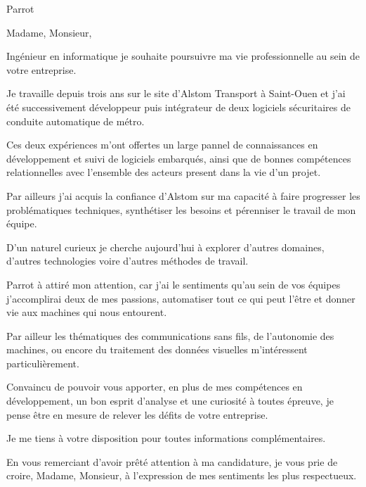 \documentclass[12pt]{lettre}
\makeatletter
\newcommand*{\NoRule}{\renewcommand*{\rule@length}{0}}
\makeatother
\begin{document}
\begin{letter}{Parrot}

  \def\concname{Objet :~}


  \signature{Hoel IRIS}
  \address{Hoel IRIS\\
  54 avenue Mathurin Moreau\\
  75019 Paris\\
  Tel : 06 18 39 30 11\\
  E-Mail : hoel.iris@gmail.com}
  \NoRule
  \notelephone
  \nofax
    \opening{Madame, Monsieur,}


    Ingénieur en informatique je souhaite poursuivre ma vie professionnelle au sein de votre entreprise.

    Je travaille depuis trois ans sur le site d'Alstom Transport à Saint-Ouen et j'ai été successivement développeur puis intégrateur de deux logiciels sécuritaires de conduite automatique de métro.

    Ces deux expériences m'ont offertes un large pannel de connaissances en développement et suivi de logiciels embarqués, ainsi que de bonnes compétences relationnelles avec l'ensemble des acteurs present dans la vie d'un projet. 

    Par ailleurs j'ai acquis la confiance d'Alstom sur ma capacité à faire progresser les problématiques techniques, synthétiser les besoins et pérenniser le travail de mon équipe.

    D'un naturel curieux je cherche aujourd'hui à explorer d'autres domaines, d'autres technologies voire d'autres méthodes de travail.

    Parrot à attiré mon attention, car j'ai le sentiments qu'au sein de vos équipes j'accomplirai deux de mes passions, automatiser tout ce qui peut l'être et donner vie aux machines qui nous entourent.
    
    Par ailleur les thématiques des communications sans fils, de l'autonomie des machines, ou encore du traitement des données visuelles m'intéressent particulièrement.  

    Convaincu de pouvoir vous apporter, en plus de mes compétences en développement, un bon esprit d'analyse et une curiosité à toutes épreuve, je pense être en mesure de relever les défits de votre entreprise.
        
    Je me tiens à votre disposition pour toutes informations complémentaires.
 
    
    \closing{En vous remerciant d’avoir prêté attention à ma candidature, je vous prie de croire, Madame, Monsieur, à l’expression de mes sentiments les plus respectueux.}
    
 
\end{letter}
 
\end{document}

